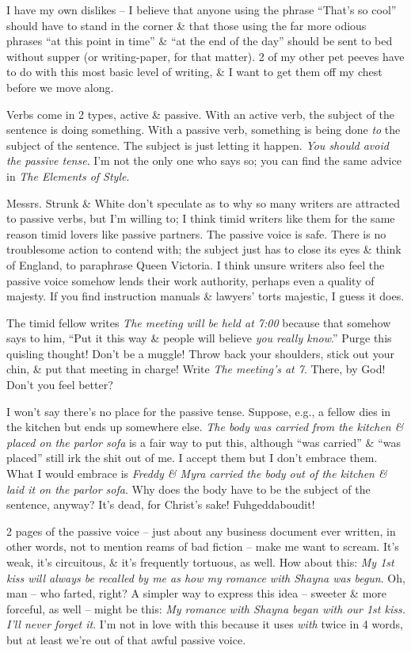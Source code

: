\documentclass{article}
\numberwithin{equation}{section}
\begin{document}
I have my own dislikes -- I believe that anyone using the phrase ``That's so cool'' should have to stand in the corner \& that those using the far more odious phrases ``at this point in time'' \& ``at the end of the day'' should be sent to bed without supper (or writing-paper, for that matter). 2 of my other pet peeves have to do with this most basic level of writing, \& I want to get them off my chest before we move along.

Verbs come in 2 types, active \& passive. With an active verb, the subject of the sentence is doing something. With a passive verb, something is being done \textit{to} the subject of the sentence. The subject is just letting it happen. \textit{You should avoid the passive tense}. I'm not the only one who says so; you can find the same advice in \textit{The Elements of Style}.

Messrs. Strunk \& White don't speculate as to why so many writers are attracted to passive verbs, but I'm willing to; I think timid writers like them for the same reason timid lovers like passive partners. The passive voice is safe. There is no troublesome action to contend with; the subject just has to close its eyes \& think of England, to paraphrase Queen Victoria. I think unsure writers also feel the passive voice somehow lends their work authority, perhaps even a quality of majesty. If you find instruction manuals \& lawyers' torts majestic, I guess it does.

The timid fellow writes \textit{The meeting will be held at 7:00} because that somehow says to him, ``Put it this way \& people will believe \textit{you really know}.'' Purge this quisling thought! Don't be a muggle! Throw back your shoulders, stick out your chin, \& put that meeting in charge! Write \textit{The meeting's at 7}. There, by God! Don't you feel better?

I won't say there's no place for the passive tense. Suppose, e.g., a fellow dies in the kitchen but ends up somewhere else. \textit{The body was carried from the kitchen \& placed on the parlor sofa} is a fair way to put this, although ``was carried'' \& ``was placed'' still irk the shit out of me. I accept them but I don't embrace them. What I would embrace is \textit{Freddy \& Myra carried the body out of the kitchen \& laid it on the parlor sofa}. Why does the body have to be the subject of the sentence, anyway? It's dead, for Christ's sake! Fuhgeddaboudit!

2 pages of the passive voice -- just about any business document ever written, in other words, not to mention reams of bad fiction -- make me want to scream. It's weak, it's circuitous, \& it's frequently tortuous, as well. How about this: \textit{My 1st kiss will always be recalled by me as how my romance with Shayna was begun}. Oh, man -- who farted, right? A simpler way to express this idea -- sweeter \& more forceful, as well -- might be this: \textit{My romance with Shayna began with our 1st kiss. I'll never forget it}. I'm not in love with this because it uses \textit{with} twice in 4 words, but at least we're out of that awful passive voice.
\end{document}
